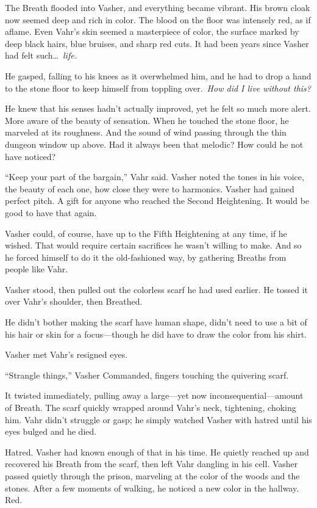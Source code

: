 The Breath flooded into Vasher, and everything became vibrant. His brown cloak now seemed deep and rich in color. The blood on the floor was intensely red, as if aflame. Even Vahr’s skin seemed a masterpiece of color, the surface marked by deep black hairs, blue bruises, and sharp red cuts. It had been years since Vasher had felt such\ldots~\textit{life.}

He gasped, falling to his knees as it overwhelmed him, and he had to drop a hand to the stone floor to keep himself from toppling over.~\textit{How did I live without this?}

He knew that his senses hadn’t actually improved, yet he felt so much more alert. More aware of the beauty of sensation. When he touched the stone floor, he marveled at its roughness. And the sound of wind passing through the thin dungeon window up above. Had it always been that melodic? How could he not have noticed?

“Keep your part of the bargain,” Vahr said. Vasher noted the tones in his voice, the beauty of each one, how close they were to harmonics. Vasher had gained perfect pitch. A gift for anyone who reached the Second Heightening. It would be good to have that again.

Vasher could, of course, have up to the Fifth Heightening at any time, if he wished. That would require certain sacrifices he wasn’t willing to make. And so he forced himself to do it the old-fashioned way, by gathering Breaths from people like Vahr.

Vasher stood, then pulled out the colorless scarf he had used earlier. He tossed it over Vahr’s shoulder, then Breathed.

He didn’t bother making the scarf have human shape, didn’t need to use a bit of his hair or skin for a focus—though he did have to draw the color from his shirt.

Vasher met Vahr’s resigned eyes.

“Strangle things,” Vasher Commanded, fingers touching the quivering scarf.

It twisted immediately, pulling away a large—yet now inconsequential—amount of Breath. The scarf quickly wrapped around Vahr’s neck, tightening, choking him. Vahr didn’t struggle or gasp; he simply watched Vasher with hatred until his eyes bulged and he died.

Hatred. Vasher had known enough of that in his time. He quietly reached up and recovered his Breath from the scarf, then left Vahr dangling in his cell. Vasher passed quietly through the prison, marveling at the color of the woods and the stones. After a few moments of walking, he noticed a new color in the hallway. Red.

